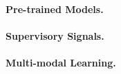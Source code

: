 \paragraph{Pre-trained Models.} 

\paragraph{Supervisory Signals.}

\paragraph{Multi-modal Learning.}